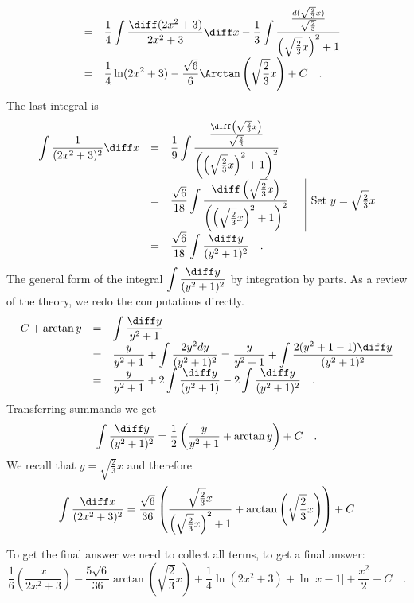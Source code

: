 {\[\begin{array}{rcl}
&=&\displaystyle  \frac{1}{4} \int \frac{\diff(2x^2+3)}{2x^2+3}\diff x- \frac{1}{3}\int \frac{\frac{d (\sqrt{\frac23}x)} {\sqrt{\frac23}}} {\left( \sqrt{\frac23}x\right)^2+1} \\
&=&\displaystyle   \frac{1}{4}\ln (2x^2+3)-\frac{\sqrt{6}}{6}\Arctan \left(\sqrt{\frac23}x\right)+C
\quad .
\end{array}
\]
The last integral is
\[
\begin{array}{rcll|l}
\displaystyle \int \frac{1}{(2x^2+3)^2}\diff x&=&\displaystyle  \frac{1}{9} \int \frac{\frac{\diff\left(\sqrt{\frac{2}{3}}x\right)}{\sqrt{\frac23}}}{\left(\left(\sqrt{\frac23}x\right)^2+1\right)^2}\\
&=&\displaystyle  \frac{\sqrt{6}}{18}\int \frac{\diff\left(\sqrt{\frac23}x\right)}{\left(\left(\sqrt{\frac23}x\right)^2+1\right)^2} &&\text{Set }y=\sqrt{\frac23}x\\
&=&\displaystyle  \frac{\sqrt{6}}{18}\int \frac{\diff y}{(y^2+1)^2}\quad.
\end{array}
\]
The general form of the integral $\displaystyle\int \frac{\diff y}{(y^2+1)^2}$  by integration by parts. As a review of the theory, we redo the computations directly.
\[
\begin{array}{rcl}
C+\arctan y &=&\displaystyle \int \frac{\diff y}{y^2+1}\\
&=&\displaystyle \frac{y}{y^2+1} +\int \frac{2y^2dy }{( y^2+ 1 )^2}= \frac{y}{y^2+1}+\int \frac{2(y^2+1-1)\diff y}{(y^2+1)^2}\\
&=&\displaystyle \frac{y}{y^2+1} + 2\int \frac{\diff y}{ ( y^2 +1)}- 2\int \frac{\diff y}{(y^2+1)^2}\quad.
\end{array}
\]
Transferring summands we get
\[
\int \frac{\diff y}{(y^2+1)^2}= \frac{1}{2} \left( \frac{ y }{y^2+1} +\arctan y\right) +C\quad .
\]
We recall that $y=\sqrt{\frac{2}{3}}x$ and therefore
\[
\int \frac{\diff x}{(2x^2+3)^2}=\frac{\sqrt{6}}{36}\left(\frac{\sqrt{\frac{2}{3}}x}{\left(\sqrt{\frac{2}{3}}x\right)^2+1}+\arctan \left( \sqrt{\frac{2}{3}}x\right)\right) +C
\]

To get the final answer we need to collect all terms, to get a final answer:
\[
\frac{1}{6}\left(\frac{x}{2x^2+3}\right) - \frac{5\sqrt{6}}{36} \arctan \left(\sqrt{\frac{2}{3}}x \right) +\frac{1}{4} \ln (2x^2+3) +\ln|x-1|+\frac{x ^2 } 2+ C\quad .
\]
}